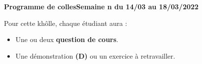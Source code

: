 \documentclass[twoside,a4paper,french,10pt]{VcCours}
\begin{document}

\begin{center}
\large\bf
Programme de collesSemaine n du 14/03 au 18/03/2022
\end{center}
\separationTitre


Pour cette khôlle, chaque étudiant aura :
\begin{itemize}
\item Une ou deux \textbf{question de cours}.
\item Une démonstration \textbf{(D)} ou un exercice à retravailler.
\end{itemize} 
  
\end{document}
